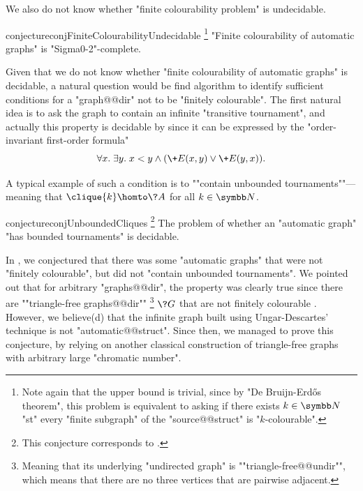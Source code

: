 We also do not know whether "finite colourability problem" is undecidable.
\begin{restatable}{conjecture}{conjFiniteColourabilityUndecidable}
	\!\footnote{Note again that the upper bound is trivial, since by "De Bruijn-Erdős theorem",
	this problem is equivalent to asking if there exists $k\in \N$ "st"
	every "finite subgraph" of the "source@@struct" is "$k$-colourable".}
	\AP\label{conj:finite-colourability-undecidable}
	"Finite colourability of automatic graphs" is "Sigma0-2"-complete.
\end{restatable}

Given that we do not know whether "finite colourability of automatic graphs"
is decidable, a natural question would be find algorithm to identify sufficient conditions
for a "graph@@dir" not to be "finitely colourable".
The first natural idea is to ask the graph to contain an infinite "transitive tournament",
and actually this property is decidable by 
since it can be expressed by the "order-invariant first-order formula"
\[\forall x.\;\exists y.\; x < y \land (\+E(x,y) \lor \+E(y,x)).\]

A typical example of such a condition
is to \AP""contain unbounded tournaments""---meaning that $\clique{k} \homto \?A$ for all $k\in\N$.

\begin{restatable}{conjecture}{conjUnboundedCliques}
	\!\footnote{This conjecture corresponds to \cite[Conjecture 7.3]{BarceloFigueiraMorvan2023SeparatingAutomatic}.}
	\AP\label{conj:unbounded-cliques}
    The problem of whether an "automatic graph" "has bounded tournaments" is decidable.
\end{restatable}

In \cite[Conjecture 7.2]{BarceloFigueiraMorvan2023SeparatingAutomatic}, we conjectured
that there was some "automatic graphs" that were not "finitely colourable",
but did not "contain unbounded tournaments".
We pointed out that for arbitrary "graphs@@dir", the property was clearly true 
since there are \AP""triangle-free graphs@@dir""%
\footnote{Meaning that its underlying "undirected graph" is \AP""triangle-free@@undir"",
which means that there are no three vertices that are pairwise adjacent.}
$\?G$ that are not finitely colourable \cite{UngarDescartes1954ChromaticGraphs}.
However, we believe(d) that the infinite graph built using Ungar-Descartes' technique
is not "automatic@@struct".
Since then, we managed to prove this conjecture, by relying on another classical construction of
triangle-free graphs with arbitrary large "chromatic number".

